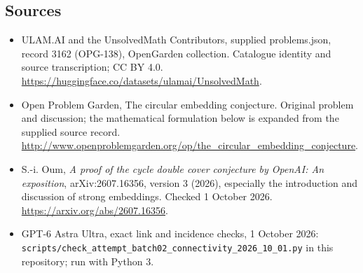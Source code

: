 \documentclass[11pt,a4paper]{article}
\begin{document}
\subsection{Sources}
\begin{itemize}
\item[S1] ULAM.AI and the UnsolvedMath Contributors, supplied problems.json, record 3162 (OPG-138), OpenGarden collection. Catalogue identity and source transcription; CC BY 4.0.
\url{https://huggingface.co/datasets/ulamai/UnsolvedMath}.
\item[S2] Open Problem Garden, The circular embedding conjecture. Original problem and discussion; the mathematical formulation below is expanded from the supplied source record.
\url{http://www.openproblemgarden.org/op/the_circular_embedding_conjecture}.
\item[S3] S.-i. Oum, \emph{A proof of the cycle double cover conjecture by OpenAI: An exposition}, arXiv:2607.16356, version 3 (2026), especially the introduction and discussion of strong embeddings. Checked 1 October 2026.
\url{https://arxiv.org/abs/2607.16356}.
\item[S4] GPT-6 Astra Ultra, exact link and incidence checks, 1 October 2026: \texttt{scripts/check\_attempt\_batch02\_connectivity\_2026\_10\_01.py} in this repository; run with Python 3.
\end{itemize}
\end{document}
